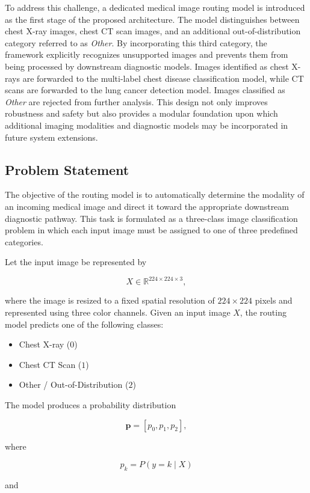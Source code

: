 To address this challenge, a dedicated medical image routing model is introduced as the first stage of the proposed architecture. The model distinguishes between chest X-ray images, chest CT scan images, and an additional out-of-distribution category referred to as \emph{Other}. By incorporating this third category, the framework explicitly recognizes unsupported images and prevents them from being processed by downstream diagnostic models. Images identified as chest X-rays are forwarded to the multi-label chest disease classification model, while CT scans are forwarded to the lung cancer detection model. Images classified as \emph{Other} are rejected from further analysis. This design not only improves robustness and safety but also provides a modular foundation upon which additional imaging modalities and diagnostic models may be incorporated in future system extensions.

\subsection{Problem Statement}

The objective of the routing model is to automatically determine the modality of an incoming medical image and direct it toward the appropriate downstream diagnostic pathway. This task is formulated as a three-class image classification problem in which each input image must be assigned to one of three predefined categories.

Let the input image be represented by

\[
X \in \mathbb{R}^{224 \times 224 \times 3},
\]

where the image is resized to a fixed spatial resolution of \(224 \times 224\) pixels and represented using three color channels. Given an input image \(X\), the routing model predicts one of the following classes:

\begin{itemize}
	\item Chest X-ray (\(0\))
	\item Chest CT Scan (\(1\))
	\item Other / Out-of-Distribution (\(2\))
\end{itemize}

The model produces a probability distribution

\[
\mathbf{p}=[p_0,p_1,p_2],
\]

where

\[
p_k=P(y=k \mid X)
\]

and

